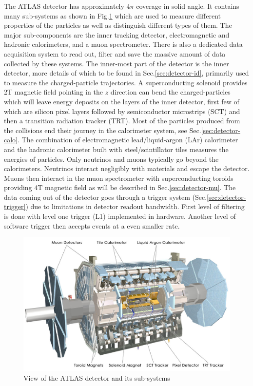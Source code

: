 The ATLAS detector has approximately $4\pi$ coverage in solid angle. It contains many sub-systems as shown in Fig.\ref{fig:detector-atlas} which are used to measure different properties of the particles as well as distinguish different types of them. The major sub-components are the inner tracking detector, electromagnetic and hadronic calorimeters, and a muon spectrometer. There is also a dedicated data acquisition system to read out, filter and save the massive amount of data collected by these systems. The inner-most part of the detector is the inner detector, more details of which to be found in Sec.\ref{sec:detector-id}, primarily used to measure the charged-particle trajectories. A superconducting solenoid provides 2T magnetic field pointing in the $z$ direction can bend the charged-particles which will leave energy deposits on the layers of the inner detector, first few of which are silicon pixel layers followed by semiconductor microstrips (SCT) and then a transition radiation tracker (TRT). Most of the particles produced from the collisions end their journey in the calorimeter system, see Sec.\ref{sec:detector-calo}. The combination of electromagnetic lead/liquid-argon (LAr) calorimeter and the hadronic calorimeter built with steel/scintillator tiles measures the energies of particles. Only neutrinos and muons typically go beyond the calorimeters. Neutrinos interact negligibly with materials and escape the detector. Muons then interact in the muon spectrometer with superconducting toroids providing 4T magnetic field as will be described in Sec.\ref{sec:detector-mu}. The data coming out of the detector goes through a trigger system (Sec.\ref{sec:detector-trigger}) due to limitations in detector readout bandwidth. First level of filtering is done with level one trigger (L1) implemented in hardware. Another level of software trigger then accepts events at a even smaller rate. 


\begin{figure}[htpb!]
\begin{center}
  \includegraphics[width=0.85\linewidth]{figures/detector/ATLAS_Silver_White_MK}
\caption{View of the ATLAS detector and its sub-systems}
\label{fig:detector-atlas}
\end{center}
\end{figure}


